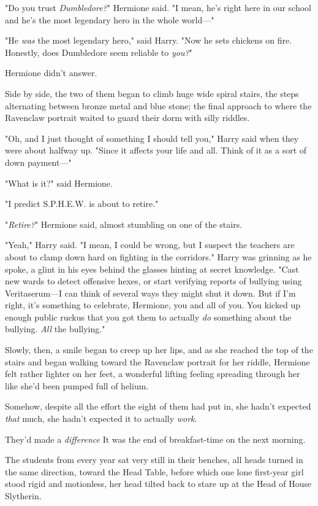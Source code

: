 "Do you trust \emph{Dumbledore?}" Hermione said. "I mean, he's right here in
our school and he's the most legendary hero in the whole world\mbox{---}"

"He \emph{was} the most legendary hero," said Harry. "Now he sets chickens on
fire. Honestly, does Dumbledore seem reliable to \emph{you?}"

Hermione didn't answer.

Side by side, the two of them began to climb huge wide spiral stairs, the steps
alternating between bronze metal and blue stone; the final approach to where
the Ravenclaw portrait waited to guard their dorm with silly riddles.

"Oh, and I just thought of something I should tell you," Harry said when they
were about halfway up. "Since it affects your life and all. Think of it as a
sort of down payment\mbox{---}"

"What is it?" said Hermione.

"I predict S.P.H.E.W. is about to retire."

"\emph{Retire?}" Hermione said, almost stumbling on one of the stairs.

"Yeah," Harry said. "I mean, I could be wrong, but I suspect the teachers are
about to clamp down hard on fighting in the corridors." Harry was grinning as
he spoke, a glint in his eyes behind the glasses hinting at secret knowledge.
"Cast new wards to detect offensive hexes, or start verifying reports of
bullying using Veritaserum---I can think of several ways they might shut it
down. But if I'm right, it's something to celebrate, Hermione, you and all of
you. You kicked up enough public ruckus that you got them to actually \emph{do}
something about the bullying. \emph{All} the bullying."

Slowly, then, a smile began to creep up her lips, and as she reached the top of
the stairs and began walking toward the Ravenclaw portrait for her riddle,
Hermione felt rather lighter on her feet, a wonderful lifting feeling spreading
through her like she'd been pumped full of helium.

Somehow, despite all the effort the eight of them had put in, she hadn't
expected \emph{that} much, she hadn't expected it to actually \emph{work}.

They'd made a \emph{difference{\el}}
\sbreak
It was the end of breakfast-time on the next morning.

The students from every year sat very still in their benches, all heads turned
in the same direction, toward the Head Table, before which one lone first-year
girl stood rigid and motionless, her head tilted back to stare up at the Head
of House Slytherin.

